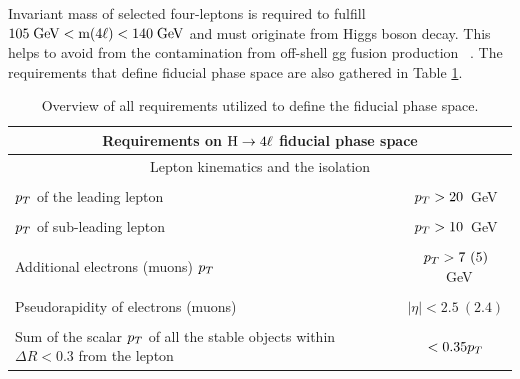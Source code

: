 Invariant  mass of selected four-leptons is required to fulfill  $105 \hbox{$\;\hbox{\rm GeV}$} < \mathrm{m}(4\ell) < 140 \hbox{$\;\hbox{\rm GeV}$}$ and must originate from Higgs boson decay. This helps to
 avoid from the contamination from off-shell gg fusion production
~\cite{Kauer:2013cga, Kauer:2012hd}. The requirements
that define  fiducial phase space are also gathered in Table \ref{tab:FidDef}.
\begin{table}[!h!tb]
\begin{center}
\small
\caption{
Overview of all requirements utilized to define the fiducial phase space.
\label{tab:FidDef}
}
\begin{tabular}{|lc|}
\hline %
\hline %
\multicolumn{2}{|c|}{\textbf{Requirements on $\mathrm{H}\rightarrow4\ell$ fiducial phase space}} \\
\hline %
\hline %
\multicolumn{2}{|c|}{Lepton kinematics and the isolation} \\
\hline %
\vspace{-0.4cm} & \\
$p_T$ of the leading lepton & $p_T  > 20$~GeV \\
\vspace{-0.4cm} & \\
$p_T$ of sub-leading lepton  & $p_T  > 10$~GeV \\
\vspace{-0.4cm} & \\
Additional electrons (muons) $p_T$ & $p_T  > 7~(5)$~GeV \\
\vspace{-0.4cm} & \\
Pseudorapidity of electrons (muons) & $|\eta| < 2.5~(2.4)$ \\
\vspace{-0.4cm} & \\
Sum of the scalar $p_T$ of all the stable objects within $\Delta R < 0.3$ from the lepton & $< 0.35 p_T$ \\
\hline %
\hline %

\end{tabular}
\end{center}
\end{table}
